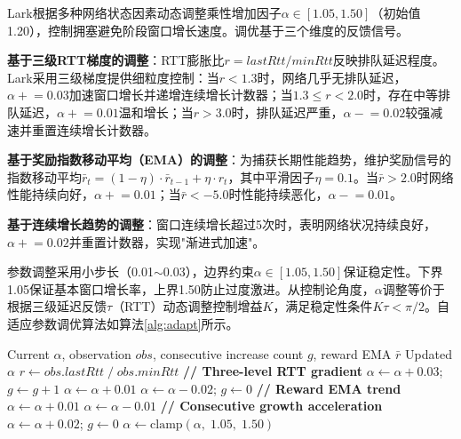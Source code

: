 \documentclass[10pt,twocolumn]{article}
\begin{document}
Lark根据多种网络状态因素动态调整乘性增加因子$\alpha \in [1.05, 1.50]$（初始值1.20），控制拥塞避免阶段窗口增长速度。调优基于三个维度的反馈信号。

\textbf{基于三级RTT梯度的调整}：RTT膨胀比$r = lastRtt/minRtt$反映排队延迟程度。Lark采用三级梯度提供细粒度控制：当$r < 1.3$时，网络几乎无排队延迟，$\alpha \mathrel{+}= 0.03$加速窗口增长并递增连续增长计数器；当$1.3 \leq r < 2.0$时，存在中等排队延迟，$\alpha \mathrel{+}= 0.01$温和增长；当$r > 3.0$时，排队延迟严重，$\alpha \mathrel{-}= 0.02$较强减速并重置连续增长计数器。

\textbf{基于奖励指数移动平均（EMA）的调整}：为捕获长期性能趋势，维护奖励信号的指数移动平均$\bar{r}_t = (1 - \eta) \cdot \bar{r}_{t-1} + \eta \cdot r_t$，其中平滑因子$\eta = 0.1$。当$\bar{r} > 2.0$时网络性能持续向好，$\alpha \mathrel{+}= 0.01$；当$\bar{r} < -5.0$时性能持续恶化，$\alpha \mathrel{-}= 0.01$。

\textbf{基于连续增长趋势的调整}：窗口连续增长超过5次时，表明网络状况持续良好，$\alpha \mathrel{+}= 0.02$并重置计数器，实现"渐进式加速"。

参数调整采用小步长（0.01$\sim$0.03），边界约束$\alpha \in [1.05, 1.50]$保证稳定性。下界1.05保证基本窗口增长率，上界1.50防止过度激进。从控制论角度，$\alpha$调整等价于根据三级延迟反馈$\tau$（RTT）动态调整控制增益$K$，满足稳定性条件$K\tau < \pi/2$\cite{tcp_congestion}。自适应参数调优算法如算法\ref{alg:adapt}所示。

\begin{algorithm}[htbp]
\caption{RL-Driven Adaptive Parameter Tuning}
\label{alg:adapt}
\small
\begin{algorithmic}[1]
\REQUIRE Current $\alpha$, observation $obs$, consecutive increase count $g$, reward EMA $\bar{r}$
\ENSURE Updated $\alpha$
\STATE $r \leftarrow obs.lastRtt \;/\; obs.minRtt$ 
\STATE \textbf{// Three-level RTT gradient}
    \STATE $\alpha \leftarrow \alpha + 0.03$; $g \leftarrow g + 1$
    \STATE $\alpha \leftarrow \alpha + 0.01$
    \STATE $\alpha \leftarrow \alpha - 0.02$; $g \leftarrow 0$
\ENDIF
\STATE \textbf{// Reward EMA trend}
    \STATE $\alpha \leftarrow \alpha + 0.01$
    \STATE $\alpha \leftarrow \alpha - 0.01$
\ENDIF
\STATE \textbf{// Consecutive growth acceleration}
    \STATE $\alpha \leftarrow \alpha + 0.02$; $g \leftarrow 0$
\ENDIF
\STATE $\alpha \leftarrow \text{clamp}(\alpha, \; 1.05, \; 1.50)$
\end{algorithmic}
\end{algorithm}
\end{document}
